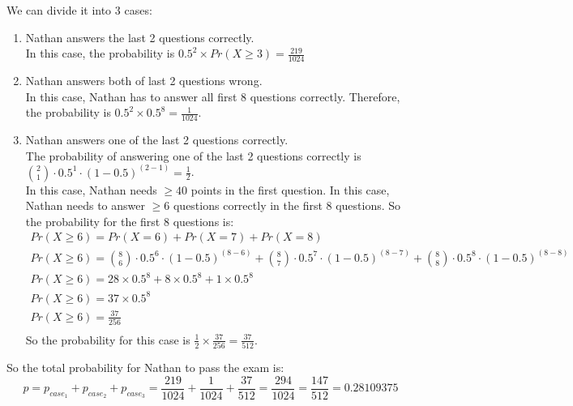 \documentclass{article}
\begin{document}
We can divide it into 3 cases:
\begin{enumerate}
\item Nathan answers the last 2 questions correctly.\\
In this case, the probability is \( 0.5^2 \times Pr(X \geq 3) = \frac{219}{1024} \)
\item Nathan answers both of last 2 questions wrong.\\
In this case, Nathan has to answer all first 8 questions correctly. Therefore, the probability is \( 0.5^2 \times 0.5^8 = \frac{1}{1024}\).
\item Nathan answers one of the last 2 questions correctly.\\
The probability of answering one of the last 2 questions correctly is \( {2 \choose 1} \cdot 0.5^1 \cdot (1-0.5)^{(2-1)}= \frac{1}{2} \). \\
In this case, Nathan needs \( \geq 40 \) points in the first question. In this case, Nathan needs to answer \( \geq 6 \) questions correctly in the first 8 questions. So the probability for the first 8 questions is:
\[
\begin{array}{ll}
Pr(X \geq 6) = Pr(X = 6) + Pr(X = 7) + Pr(X = 8) \\
Pr(X \geq 6) = {8 \choose 6} \cdot 0.5^6 \cdot (1-0.5)^{(8-6)} + {8 \choose 7} \cdot 0.5^7 \cdot (1-0.5)^{(8-7)} + {8 \choose 8} \cdot 0.5^8 \cdot (1-0.5)^{(8-8)} \\
Pr(X \geq 6) = 28 \times 0.5^8 + 8 \times 0.5^8 +  1 \times 0.5^8 \\
Pr(X \geq 6) = 37 \times 0.5^8 \\
Pr(X \geq 6) = \frac{37}{256} \\
\end{array}
\]
So the probability for this case is \( \frac{1}{2} \times \frac{37}{256} = \frac{37}{512} \).
\end{enumerate}


So the total probability for Nathan to pass the exam is:
\[
p = p_{case_1} + p_{case_2} + p_{case_3} = \frac{219}{1024} + \frac{1}{1024} + \frac{37}{512} = \frac{294}{1024} = \frac{147}{512} = 0.28109375
\]
\end{document}
